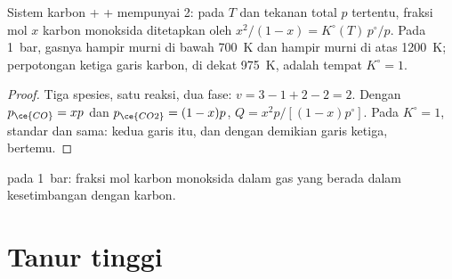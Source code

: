 \begin{proposition}\label{prop:b2:ellingham:boudouard}
Sistem karbon +  +  mempunyai  2: pada $T$ dan
tekanan total $p$ tertentu, fraksi mol $x$ karbon monoksida ditetapkan oleh
$x^2/(1 - x)
= K^\circ(T)\,p^\circ/p$. Pada \qty{1}{bar}, gasnya hampir
murni  di bawah \qty{700}{K} dan hampir murni  di atas
\qty{1200}{K}; perpotongan ketiga garis karbon, di dekat \qty{975}{K},
adalah tempat $K^\circ = 1$.
\end{proposition}

\begin{proof}
Tiga spesies, satu reaksi, dua fase: $v = 3 - 1 + 2 - 2 = 2$. Dengan
$p_{\ce{CO}}
= xp$ dan $p_{\ce{CO2}} = (1 - x)p$,
$Q = x^2p/[(1 - x)p^\circ]$. Pada $K^\circ = 1$,  standar
 dan  sama: kedua garis itu, dan
dengan demikian garis ketiga, bertemu.
\end{proof}

\begin{omfigure}

{\small {} pada \qty{1}{bar}: fraksi mol karbon
monoksida dalam gas yang berada dalam kesetimbangan dengan karbon.}
\end{omfigure}

\section{Tanur tinggi}

